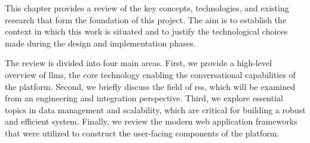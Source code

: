 This chapter provides a review of the key concepts, technologies, and existing research that form the foundation of this project. The aim is to establish the context in which this work is situated and to justify the technological choices made during the design and implementation phases.

The review is divided into four main areas. First, we provide a high-level overview of \acp{llm}, the core technology enabling the conversational capabilities of the platform. Second, we briefly discuss the field of \acl{rs}s, which will be examined from an engineering and integration perspective. Third, we explore essential topics in data management and scalability, which are critical for building a robust and efficient system. Finally, we review the modern web application frameworks that were utilized to construct the user-facing components of the platform.